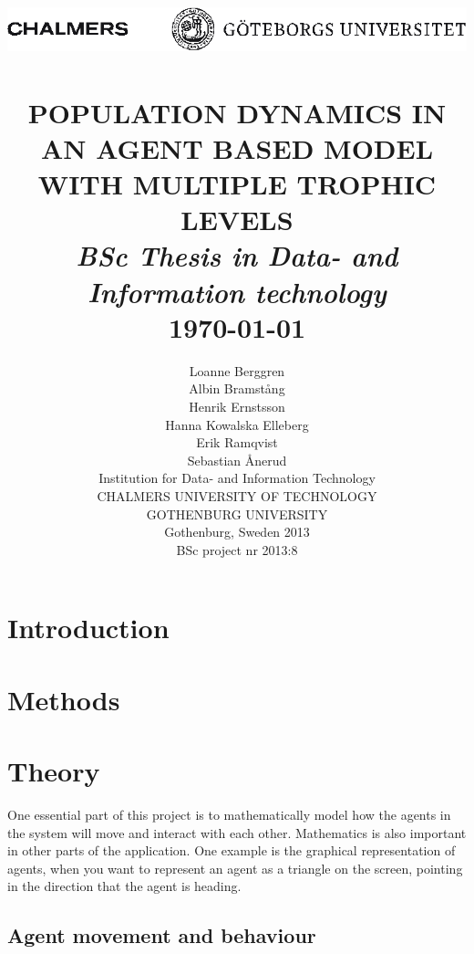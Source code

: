 \documentclass[paper=a4, fontsize=11pt,twoside]{scrartcl}		%
\title{\includegraphics[height=1.3cm,width=14cm]{CTH_GU_Header} 	%
		 	\\[2.0cm]													%
			\HRule{0.5pt} \\										%
			\LARGE \textbf{\uppercase{Population dynamics in an agent based model \\
	with multiple trophic levels}\\
	[0.5cm]
	\large\textit{BSc Thesis in Data- and Information technology}}	%
			\HRule{2pt} \\ [0.5cm]								%
			\normalsize \today									%
		}
\author{
Loanne Berggren \\
Albin Bramstång\\
Henrik Ernstsson\\
Hanna Kowalska Elleberg \\
Erik Ramqvist\\
Sebastian Ånerud\\
[2cm]
Institution for Data- and Information Technology \\
[0.5cm]
\uppercase{Chalmers University of Technology} \\
GOTHENBURG UNIVERSITY \\
Gothenburg, Sweden 2013 \\
BSc project nr 2013:8 \\
}
\makeatletter
\def\printtitle{%
    {\raggedright \@title\par}}
\def\printauthor{%
    {\raggedright \large \@author}}
\makeatother
\begin{document}
\thispagestyle{empty}				%

\printtitle									%
  	\vfill
\printauthor								%

\newpage
\tableofcontents
\newpage

\begin{flushleft} 


\section{Introduction}


\section{Methods}


\section{Theory}

One essential part of this project is to mathematically model how the agents in the system will move and interact with each other. Mathematics is also important in other parts of the application. One example is the graphical representation of agents, when you want to represent an agent as a triangle on the screen, pointing in the direction that the agent is heading.

\subsection{Agent movement and behaviour}


\end{flushleft}
\end{document}
